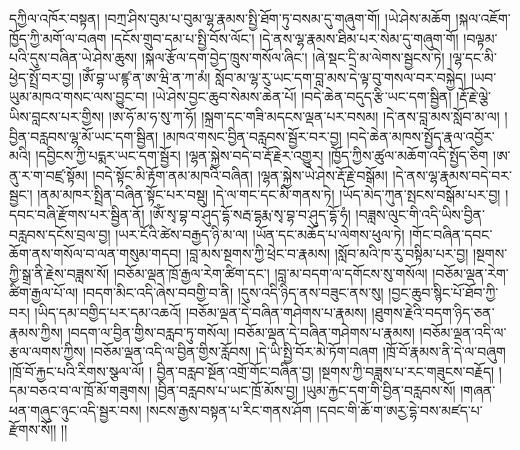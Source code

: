 དཀྱིལ་འཁོར་བསྟན། །བཀྲ་ཤིས་བུམ་པ་བུམ་ལྷ་རྣམས་སྤྱི་ཐོག་ཏུ་བསམ་དུ་གཞུག་གོ། །ཡེ་ཤེས་མཆོག །སྐལ་འཇོག་ཁྱོད་ཀྱི་མགོ་ལ་བཞག །དངོས་གྲུབ་དམ་པ་སྤྱི་བོས་ལོང་། །དེ་ནས་ལྷ་རྣམས་ཐིམ་པར་སེམ་དུ་གཞུག་གོ། །བལྟམ་པའི་དུས་བཞིན་ཡེ་ཤེས་ཆུས། །སྐལ་རྩོལ་དག་བྱེད་ཁྲུས་གསོལ་ཞིང་། །ཞེ་སྡང་དྲི་མ་ལེགས་སྦྱངས་ཏེ། །ལྷ་དང་མི་ཕྱེད་སྤྲོ་བར་བྱ། །ཨོཾ་བྷ་ཡ་ཛྙ་ན་ཨ་ཝི་ན་ཀ་མཾ། སློབ་མ་ལྷ་རུ་ཡང་དག་བླ་མས་དེ་ལྟ་བུ་གསལ་བར་བསྐྱེད། །ཡབ་ཡུམ་མཁའ་གསང་ལས་བྱུང་བ། །ཡེ་ཤེས་བྱང་ཆུབ་སེམས་ཆེན་པོ། །བདེ་ཆེན་བདུད་རྩི་ཡང་དག་སྦྱིན། །རྡོ་རྗེ་ལྕེ་ཡིས་བླངས་པར་གྱིས། །ཨ་ཧོ་མ་ཧ་སུ་ཀ་ཧོ། །སྐྲག་དང་གཟི་མདངས་ལྡན་པར་བསམ། །དེ་ནས་བླ་མས་སློབ་མ་ལ། །བྱིན་བརླབས་ལྷ་མོ་ཡང་དག་སྦྱིན། །མཁའ་གསང་བྱིན་བརླབས་སྦྱོར་བར་བྱ། །བདེ་ཆེན་མཁས་སྤྱོད་རྣལ་འབྱོར་མའི། །དབྱིངས་ཀྱི་པདྨར་ཡང་དག་སྦྱོར། །ལྷན་སྐྱེས་བདེ་བ་རྡོ་རྗེར་འགྱུར། །ཁྱོད་ཀྱིས་ཚུལ་མཆོག་འདི་སྤྱོད་ཅིག །ཨ་ནུ་ར་ག་བཛྲ་སྟོམ། །བདེ་སྟོང་མི་རྟོག་ནམ་མཁའི་བཞིན། །ལྷན་སྐྱེས་ཡེ་ཤེས་རྡོ་རྗེ་བསྒོམ། །དེ་ནས་ལྷ་རྣམས་བདེ་བར་སྦྱང་། །ནམ་མཁར་སྤྲིན་བཞིན་སྟོང་པར་བསྡུ། །དེ་ལ་གང་དང་མི་གནས་ཏེ། །ཡོད་མེད་ཀུན་སྤངས་བསྒོམ་པར་བྱ། །དབང་བཞི་རྫོགས་པར་སྦྱིན་ནོ། །ཨོཾ་སྭ་བྷ་བ་ཤུད་དྷོ་སརྦ་དྷརྨ་སྭ་བྷ་བ་ཤུད་དྷོ་ཧཾ། །བཟླས་ལུང་གི་འདི་ཡིས་བྱིན་བརླབས་དངོས་བྲལ་བྱ། །ཡར་ངོའི་ཚེས་བརྒྱད་ཉི་མ་ལ། །ཡོན་དང་མཆོད་པ་ལེགས་ཕུལ་ཏེ། །གོང་བཞིན་དབང་ཆོག་ནས་གསོལ་བ་ལན་གསུམ་གདབ། །བླ་མས་སྔགས་ཀྱི་ཕྲེང་བ་རྣམས། །སློབ་མའི་ཁ་རུ་བསྟིམ་པར་བྱ། །སྔགས་ཀྱི་སྒྲ་ནི་རྗེས་བཟླས་སོ། །བཅོམ་ལྡན་ཁྲོ་རྒྱལ་རེག་ཚིག་དང་། །བླ་མ་བདག་ལ་དགོངས་སུ་གསོལ། །བཅོམ་ལྡན་རེག་ཚིག་རྒྱལ་པོ་ལ། །བདག་མིང་འདི་ཞེས་བབགྱི་བ་ནི། །དུས་འདི་ཉིད་ནས་བཟུང་ནས་སུ། །བྱང་ཆུབ་སྙིང་པོ་ཐོབ་ཀྱི་བར། །ཡིད་དམ་བགྱིད་པར་དམ་འཆའོ། །བཅོམ་ལྡན་དེ་བཞིན་གཤེགས་པ་རྣམས། །ཐུགས་རྗེའི་བདག་ཉིད་ཅན་རྣམས་ཀྱིས། །བདག་ལ་བྱིན་གྱིས་བརླབ་ཏུ་གསོལ། །བཅོམ་ལྡན་དེ་བཞིན་གཤེགས་པ་རྣམས། །བཅོམ་ལྡན་འདི་ལ་རྩལ་ལགས་ཀྱིས། །བཅོམ་ལྡན་འདི་ལ་བྱིན་གྱིས་རློབས། །དེ་ཡི་སྤྱི་བོར་མེ་ཏོག་བཞག །ཁྲོ་བོ་རྣམས་ནི་དེ་ལ་བཞུག །ཁྲོ་བོ་རྐྱང་པའི་རིགས་སྩལ་ལོ། །
བྱིན་བརླབ་སྔོན་འགྲོ་གོང་བཞིན་བྱ། །སྔགས་ཀྱི་བཟླས་པ་རང་གཟུངས་བརྗོད། །དམ་བཅའ་བ་ལ་ཁྲོ་མོ་གཟུགས། །བྱིན་བརླབས་པ་ཡང་ཁྲོ་མོས་བྱ། །ཡུམ་རྐྱང་དག་གི་བྱིན་བརླབས་སོ། །གཞན་ཕན་གཞུང་ཉུང་འདི་སྦྱར་བས། །སངས་རྒྱས་བསྟན་པ་རིང་གནས་ཤོག །དབང་གི་ཆོ་ག་ཨརྱ་དྷེ་བས་མཛད་པ་རྫོགས་སོ།། །།